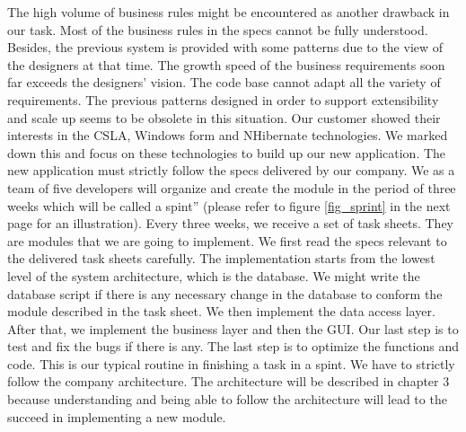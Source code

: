 The high volume of business rules might be encountered as another drawback in our task. Most of the business rules in the specs cannot be fully understood. Besides, the previous system is provided with some patterns due to the view of the designers at that time. The growth speed of the business requirements soon far exceeds the designers' vision. The code base cannot adapt all the variety of requirements. The previous patterns designed in order to support extensibility and scale up seems to be obsolete in this situation. Our customer showed their interests in the CSLA, Windows form and NHibernate technologies. We marked down this and focus on these technologies to build up our new application. The new application must strictly follow the specs delivered by our company. We as a team of five developers will organize and create the module in the period of three weeks which will be called a spint'' (please refer to figure \ref{fig_sprint} in the next page for an illustration). Every three weeks, we receive a set of task sheets. They are modules that we are going to implement. We first read the specs relevant to the delivered task sheets carefully. The implementation starts from the lowest level of the system architecture, which is the database. We might write the database script if there is any necessary change in the database to conform the module described in the task sheet. We then implement the data access layer. After that, we implement the business layer and then the GUI. Our last step is to test and fix the bugs if there is any. The last step is to optimize the functions and code. This is our typical routine in finishing a task in a spint. We have to strictly follow the company architecture.  The architecture will be described in chapter 3 because understanding and being able to follow the architecture will lead to the succeed in implementing a new module. 

